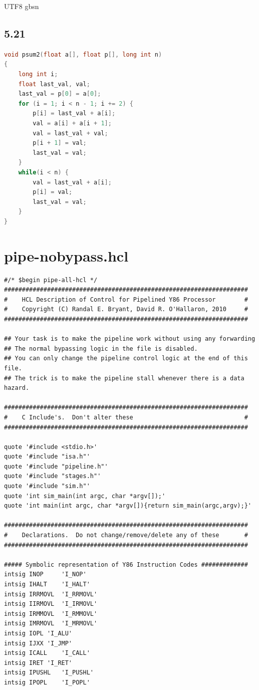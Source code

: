 \documentclass {article}
\begin{document}
\begin {CJK*} {UTF8} {gbsn}
			\subsection{5.21}
				\begin{lstlisting}[language=C]
void psum2(float a[], float p[], long int n)
{
	long int i;
	float last_val, val;
	last_val = p[0] = a[0];
	for (i = 1; i < n - 1; i += 2) {
		p[i] = last_val + a[i];
		val = a[i] + a[i + 1];
		val = last_val + val;
		p[i + 1] = val;
		last_val = val;
	}
	while(i < n) {
		val = last_val + a[i];
		p[i] = val;
		last_val = val;
	}
}
				\end{lstlisting}
				
			

		\newpage
		\appendix
		\section{pipe-nobypass.hcl}\label{appendixA}
			\begin{lstlisting}
#/* $begin pipe-all-hcl */
####################################################################
#    HCL Description of Control for Pipelined Y86 Processor        #
#    Copyright (C) Randal E. Bryant, David R. O'Hallaron, 2010     #
####################################################################

## Your task is to make the pipeline work without using any forwarding
## The normal bypassing logic in the file is disabled.
## You can only change the pipeline control logic at the end of this file.
## The trick is to make the pipeline stall whenever there is a data hazard.

####################################################################
#    C Include's.  Don't alter these                               #
####################################################################

quote '#include <stdio.h>'
quote '#include "isa.h"'
quote '#include "pipeline.h"'
quote '#include "stages.h"'
quote '#include "sim.h"'
quote 'int sim_main(int argc, char *argv[]);'
quote 'int main(int argc, char *argv[]){return sim_main(argc,argv);}'

####################################################################
#    Declarations.  Do not change/remove/delete any of these       #
####################################################################

##### Symbolic representation of Y86 Instruction Codes #############
intsig INOP 	'I_NOP'
intsig IHALT	'I_HALT'
intsig IRRMOVL	'I_RRMOVL'
intsig IIRMOVL	'I_IRMOVL'
intsig IRMMOVL	'I_RMMOVL'
intsig IMRMOVL	'I_MRMOVL'
intsig IOPL	'I_ALU'
intsig IJXX	'I_JMP'
intsig ICALL	'I_CALL'
intsig IRET	'I_RET'
intsig IPUSHL	'I_PUSHL'
intsig IPOPL	'I_POPL'


\end{lstlisting}
\end{CJK*}
\end{document}

